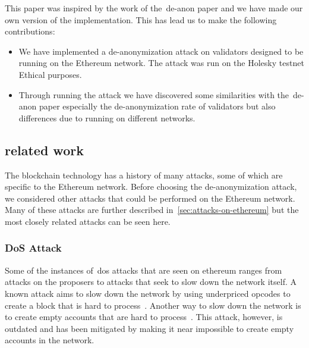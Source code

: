 This paper was inspired by the work of the~\gls{de-anon paper} and we have made our own version of the implementation.
This has lead us to make the following contributions:
\begin{itemize}
    \item We have implemented a de-anonymization attack on validators designed to be running on the Ethereum network.
    The attack was run on the Holesky testnet Ethical purposes.
    \item Through running the attack we have discovered some similarities with the~\gls{de-anon paper} especially the de-anonymization rate of validators but also differences due to running on different networks.
\end{itemize}

\subsection{related work}\label{subsec:related-work}
The blockchain technology has a history of many attacks, some of which are specific to the Ethereum network.
Before choosing the de-anonymization attack, we considered other attacks that could be performed on the Ethereum network.
Many of these attacks are further described in~\autoref{sec:attacks-on-ethereum} but the most closely related attacks can be seen here.


\subsubsection{DoS Attack}\label{subsubsec:dos-attack}
Some of the instances of~\gls{dos} attacks that are seen on ethereum ranges from attacks on the proposers to attacks that seek to slow down the network itself.
A known attack aims to slow down the network by using underpriced opcodes to create a block that is hard to process~\cite{10.1145/3391195,9815256}.
Another way to slow down the network is to create empty accounts that are hard to process~\cite{empty-account-mitigation,empty-account-eip-mitigation}.
This attack, however, is outdated and has been mitigated by making it near impossible to create empty accounts in the network.

